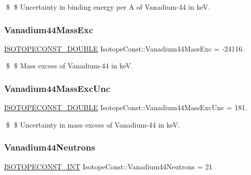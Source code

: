 \$ \$ Uncertainty in binding energy per A of Vanadium-\/44 in keV. \mbox{\label{group___isotope_const-_vanadium-_v44_gac5821fce65ca970939cc465afcdabe8c}} 
\subsubsection{\texorpdfstring{Vanadium44\+Mass\+Exc}{Vanadium44MassExc}}
{\footnotesize\ttfamily \mbox{\hyperlink{group___isotope_const-_macros_ga8f45a7272ce02c0b4c65c44636ed719a}{I\+S\+O\+T\+O\+P\+E\+C\+O\+N\+S\+T\+\_\+\+D\+O\+U\+B\+LE}} Isotope\+Const\+::\+Vanadium44\+Mass\+Exc = -\/24116.}

\$ \$ Mass excess of Vanadium-\/44 in keV. \mbox{\label{group___isotope_const-_vanadium-_v44_ga2fbf6494d91aa984a5fd89402f83a4b6}} 
\subsubsection{\texorpdfstring{Vanadium44\+Mass\+Exc\+Unc}{Vanadium44MassExcUnc}}
{\footnotesize\ttfamily \mbox{\hyperlink{group___isotope_const-_macros_ga8f45a7272ce02c0b4c65c44636ed719a}{I\+S\+O\+T\+O\+P\+E\+C\+O\+N\+S\+T\+\_\+\+D\+O\+U\+B\+LE}} Isotope\+Const\+::\+Vanadium44\+Mass\+Exc\+Unc = 181.}

\$ \$ Uncertainty in mass excess of Vanadium-\/44 in keV. \mbox{\label{group___isotope_const-_vanadium-_v44_ga36b58364034ebea6ff2f3757994509ac}} 
\subsubsection{\texorpdfstring{Vanadium44\+Neutrons}{Vanadium44Neutrons}}
{\footnotesize\ttfamily \mbox{\hyperlink{group___isotope_const-_macros_ga5f18360b3e99483a35c32d789e62621c}{I\+S\+O\+T\+O\+P\+E\+C\+O\+N\+S\+T\+\_\+\+I\+NT}} Isotope\+Const\+::\+Vanadium44\+Neutrons = 21}

